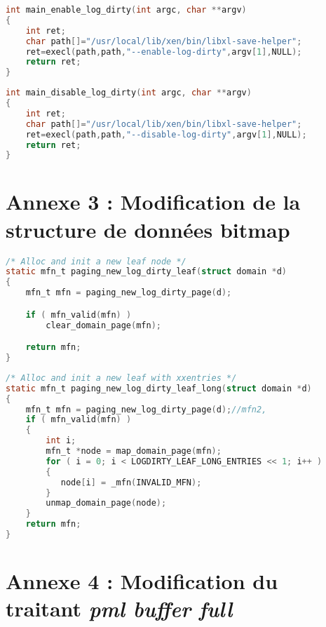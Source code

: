 \begin{lstlisting}[language=C, caption=xl enable-log-dirty, label={lst:enable_logdirty}]
int main_enable_log_dirty(int argc, char **argv)
{
    int ret;
    char path[]="/usr/local/lib/xen/bin/libxl-save-helper";
    ret=execl(path,path,"--enable-log-dirty",argv[1],NULL); 
    return ret;
}
\end{lstlisting}

\begin{lstlisting}[language=C, caption=xl disable-log-dirty, label={lst:disable_logdirty}]
int main_disable_log_dirty(int argc, char **argv)
{
    int ret;
    char path[]="/usr/local/lib/xen/bin/libxl-save-helper";
    ret=execl(path,path,"--disable-log-dirty",argv[1],NULL);
    return ret;
}
\end{lstlisting}

\section*{Annexe 3 : Modification de la structure de données bitmap}
\label{section:bitmap}

\begin{lstlisting}[language=C, caption=Méthode appelée générer une feuille L1 avant modification de la bitmap, label={lst:leaf_bit}]
/* Alloc and init a new leaf node */
static mfn_t paging_new_log_dirty_leaf(struct domain *d)
{
    mfn_t mfn = paging_new_log_dirty_page(d);

    if ( mfn_valid(mfn) )
        clear_domain_page(mfn);

    return mfn;
}
\end{lstlisting}

\begin{lstlisting}[language=C, caption=Méthode appelée pour générer un noeud L1 après modification de la bitmap, label={lst:leaf_UL}]
/* Alloc and init a new leaf with xxentries */
static mfn_t paging_new_log_dirty_leaf_long(struct domain *d)
{    
    mfn_t mfn = paging_new_log_dirty_page(d);//mfn2, 
    if ( mfn_valid(mfn) )
    {
        int i;
        mfn_t *node = map_domain_page(mfn);
        for ( i = 0; i < LOGDIRTY_LEAF_LONG_ENTRIES << 1; i++ )
        {
           node[i] = _mfn(INVALID_MFN);       
        }       
        unmap_domain_page(node);
    }  
    return mfn;
}
\end{lstlisting}

\section*{Annexe 4 : Modification du traitant \textit{pml buffer full}}
\label{section:pml_buffer_full}

